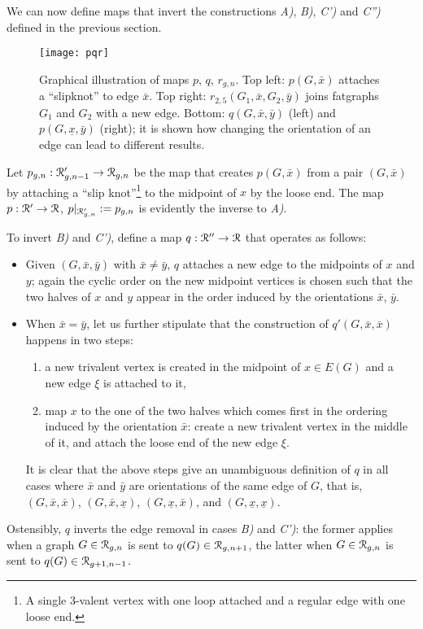 We can now define maps that invert the constructions {\sl A)}, {\sl B)},
{\sl C')} and {\sl C'')} defined in the previous section.
\begin{figure}
  \centering
  \texttt{[image: pqr]}
  \caption{Graphical illustration of maps $p$, $q$, $r_{g,n}$.  Top left: $p(G,\bar{x})$ attaches a ``slipknot'' to edge $\bar{x}$.  Top right: $r_{2,5}(G_1, \bar{x}, G_2, \bar{y})$ joins fatgraphs $G_1$ and $G_2$ with a new edge. Bottom: $q(G,\bar{x}, \bar{y})$ (left) and $p(G, \underline{x}, \bar{y})$ (right); it is shown how changing the orientation of an edge can lead to different results.}
  \label{fig:pqr}
\end{figure}

Let $p_{g,n} : \mathcal{R}'_{g,n-1} \to \mathcal{R}_{g,n}$ be the map that creates
$p(G,\bar{x})$ from a pair $(G, \bar{x})$ by attaching a ``slip
knot''\footnote{A single 3-valent vertex with one loop attached and a
  regular edge with one loose end.} to the midpoint of $x$ by the
loose end.  The map $p: \mathcal{R}' \to \mathcal{R}$, $p|_{\mathcal{R}'_{g,n}} := p_{g,n}$ is
evidently the inverse to {\sl A)}.

To invert {\sl B)} and {\sl C')}, define a map $q : \mathcal{R}'' \to \mathcal{R}$ that
operates as follows:
\begin{itemize}
\item Given $(G, \bar{x}, \bar{y})$ with $\bar{x} \not= \bar{y}$, $q$
  attaches a new edge to the midpoints of $x$ and $y$; again the
  cyclic order on the new midpoint vertices is chosen such that the
  two halves of $x$ and $y$ appear in the order induced by the
  orientations $\bar x$, $\bar y$.
\item When $\bar{x} = \bar{y}$, let us further stipulate that the
  construction of $q'(G, \bar{x}, \bar{x})$ happens in two steps:
  \begin{enumerate}
  \item a new trivalent vertex is created in the midpoint of $x \in
    E(G)$ and a new edge $\xi$ is attached to it,
  \item map $x$ to the one of the two halves which comes first in the
    ordering induced by the orientation $\bar{x}$: create a new
    trivalent vertex in the middle of it, and attach the loose end of
    the new edge $\xi$.
  \end{enumerate}
  It is clear that the above steps give an unambiguous definition of
  $q$ in all cases where $\bar{x}$ and $\bar{y}$ are orientations of
  the same edge of $G$, that is, $(G, \bar{x}, \bar{x})$, $(G,
  \bar{x}, \underline{x})$, $(G, \underline{x}, \bar{x})$, and $(G,
  \underline{x}, \underline{x})$.
\end{itemize}
Ostensibly, $q$ inverts the edge removal in cases {\sl B)} and {\sl
  C')}: the former applies when a graph $G \in \mathcal{R}_{g,n}$ is sent to
$q(G) \in \mathcal{R}_{g,n+1}$, the latter when $G \in \mathcal{R}_{g,n}$ is sent to
$q(G) \in \mathcal{R}_{g+1,n-1}$.

